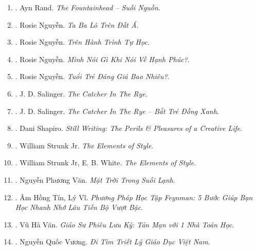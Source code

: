 \documentclass{article}
\begin{document}
\begin{enumerate}
	\item \cite{Rand_fountainhead}. Ayn Rand. {\it The Fountainhead -- Suối Nguồn}.\hfill{\sf[done]}
	
	\item \cite{Rosie_travel}. Rosie Nguyễn. {\it Ta Ba Lô Trên Đất Á}.\hfill{\sf[done]}
	
	\item \cite{Rosie_self_study}. Rosie Nguyễn. {\it Trên Hành Trình Tự Học}.\hfill{\sf[done]}
	
	\item \cite{Rosie_happy}. Rosie Nguyễn. {\it Mình Nói Gì Khi Nói Về Hạnh Phúc?}.\hfill{\sf[done]}
	
	\item \cite{Rosie_youth}. Rosie Nguyễn. {\it Tuổi Trẻ Đáng Giá Bao Nhiêu?}.\hfill{\sf[done]}
	
	\item \cite{Salinger_catcher_in_rye}. {\sc J. D. Salinger}. {\it The Catcher In The Rye}.
	
	\item \cite{Salinger_btdx}. {\sc J. D. Salinger}. {\it The Catcher In The Rye -- Bắt Trẻ Đồng Xanh}.\hfill{\sf[done]}
	
	\item \cite{Shapiro2014}. Dani Shapiro. {\it Still Writing: The Perils \& Pleasures of a Creative Life}.\hfill{\sf[reading]}
	
	\item \cite{Strunk_element_style}. William Strunk Jr. {\it The Elements of Style}.\hfill{\sf[done]}
	
	\item \cite{Strunk_White_element_style}. William Strunk Jr, E. B. White. {\it The Elements of Style}.\hfill{\sf[done]}
	
	\item \cite{Van_mat_troi_suoi_lanh}. Nguyễn Phương Văn. {\it Mặt Trời Trong Suối Lạnh}.\hfill{\sf[done]}
	
	\item \cite{Tin_Vi_Feynmann_learn_methods}. {\sc Âm Hồng Tín, Lý Vĩ}. {\it Phương Pháp Học Tập Feynman: 5 Bước Giúp Bạn Học Nhanh Nhớ Lâu Tiến Bộ Vượt Bậc}.\hfill{\sf[done]}
	
	\item \cite{Van_prof_journey}. Vũ Hà Văn. {\it Giáo Sư Phiêu Lưu Ký: Tản Mạn với 1 Nhà Toán Học}.\hfill{\sf[done]}
	
	\item \cite{Vuong_edu_philosophy}. {\sc Nguyễn Quốc Vương}. {\it Đi Tìm Triết Lý Giáo Dục Việt Nam}.\hfill{\sf[done]}
	

\end{enumerate}
\end{document}
